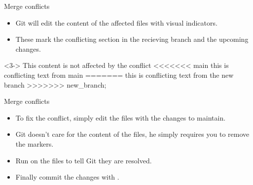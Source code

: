 \begin{frame}[fragile]{Merge conflicts \insertcontinuationtext}
    \begin{itemize}[<+->]
        \item Git will edit the content of the affected files with visual indicators.
        \item These mark the conflicting section in the recieving branch and the upcoming changes. 
    \end{itemize}
    \begin{codeblock}<3->
    This content is not affected by the conflict
    <<<<<<< main
    this is conflicting text from main
    =======
    this is conflicting text from the new branch
    >>>>>>> new_branch;
    \end{codeblock}
\end{frame}

\begin{frame}[fragile]{Merge conflicts \insertcontinuationtext}
    \begin{itemize}[<+->]
        \item To fix the conflict, simply edit the files with the changes to maintain.
        \item Git doesn't care for the content of the files, he simply requires you to remove the markers.
        \item Run  on the files to tell Git they are resolved.
        \item Finally commit the changes with .
    \end{itemize}
\end{frame}

